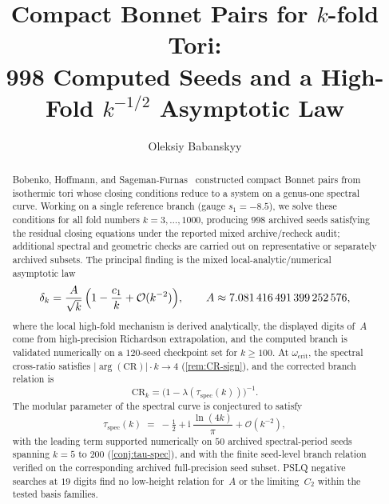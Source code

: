 \documentclass[11pt,a4paper]{article}
\title{%
  Compact Bonnet Pairs for $k$-fold Tori:\\
  998 Computed Seeds and a High-Fold $k^{-1/2}$
  Asymptotic Law}
\author{%
  Oleksiy Babanskyy
}
\date{}
\theoremstyle{plain}
\theoremstyle{definition}
\theoremstyle{remark}
\newcommand{\ii}{\mathrm{i}}
\newcommand{\Oo}{\mathcal{O}}
\begin{document}
\maketitle

\begin{abstract}
Bobenko, Hoffmann, and Sageman-Furnas~\cite{BHS25} constructed
compact Bonnet pairs from isothermic tori whose closing conditions
reduce to a system on a genus-one spectral curve.
Working on a single reference branch (gauge $s_1=-8.5$), we solve
these conditions for all fold numbers $k=3,\ldots,1000$, producing
$998$ archived seeds satisfying the residual closing equations under the
reported mixed archive/recheck audit; additional spectral and geometric
checks are carried out on representative or separately archived subsets.
The principal finding is the mixed local-analytic/numerical
asymptotic law
\[
  \delta_k = \frac{A}{\sqrt{k}}\,\Bigl(1 - \frac{c_1}{k}
  + \Oo(k^{-2})\Bigr),
  \qquad A \approx 7.081\,416\,491\,399\,252\,576,
\]
where the local high-fold mechanism is derived analytically, the
displayed digits of~$A$ come from high-precision Richardson
extrapolation, and the computed branch is validated numerically on a
$120$-seed checkpoint set for $k\ge100$.  At $\omega_{\mathrm{crit}}$, the spectral
cross-ratio satisfies $\lvert\arg(\mathrm{CR})\rvert\cdot k\to4$
(\cref{rem:CR-sign}), and the corrected branch relation is
\[
  \mathrm{CR}_k = \bigl(1-\lambda(\tau_{\mathrm{spec}}(k))\bigr)^{-1}.
\]
The modular parameter of the spectral curve is conjectured to satisfy
\[
  \tau_{\mathrm{spec}}(k)
  \;=\; -\tfrac{1}{2} + \ii\,\frac{\ln(4k)}{\pi}
  + \Oo(k^{-2}),
\]
with the leading term supported numerically on $50$ archived
spectral-period seeds spanning $k=5$ to $200$
(\cref{conj:tau-spec}), and with the finite seed-level branch relation
verified on the corresponding archived full-precision seed subset.
PSLQ negative searches at $19$ digits find no
low-height relation for~$A$ or the limiting~$C_2$ within the tested
basis families.
\end{abstract}
\end{document}
